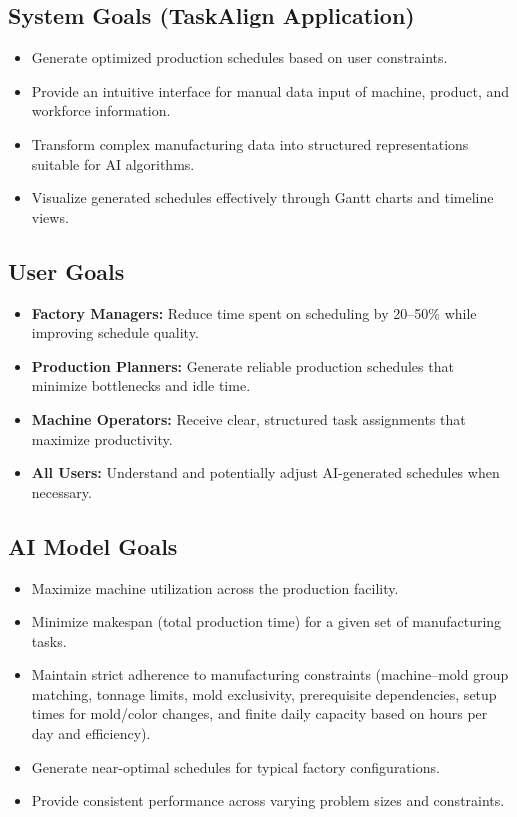 \subsection{System Goals (TaskAlign Application)}
\begin{itemize}
    \item Generate optimized production schedules based on user constraints.
    \item Provide an intuitive interface for manual data input of machine, product, and workforce information.
    \item Transform complex manufacturing data into structured representations suitable for AI algorithms.
    \item Visualize generated schedules effectively through Gantt charts and timeline views.
\end{itemize}

\subsection{User Goals}
\begin{itemize}
    \item \textbf{Factory Managers:} Reduce time spent on scheduling by 20--50\% while improving schedule quality.
    \item \textbf{Production Planners:} Generate reliable production schedules that minimize bottlenecks and idle time.
    \item \textbf{Machine Operators:} Receive clear, structured task assignments that maximize productivity.
    \item \textbf{All Users:} Understand and potentially adjust AI-generated schedules when necessary.
\end{itemize}

\subsection{AI Model Goals}
\begin{itemize}
    \item Maximize machine utilization across the production facility.
    \item Minimize makespan (total production time) for a given set of manufacturing tasks.
    \item Maintain strict adherence to manufacturing constraints (machine--mold group matching, tonnage limits, mold exclusivity, prerequisite dependencies, setup times for mold/color changes, and finite daily capacity based on hours per day and efficiency).
    \item Generate near-optimal schedules for typical factory configurations.
    \item Provide consistent performance across varying problem sizes and constraints.
\end{itemize}

